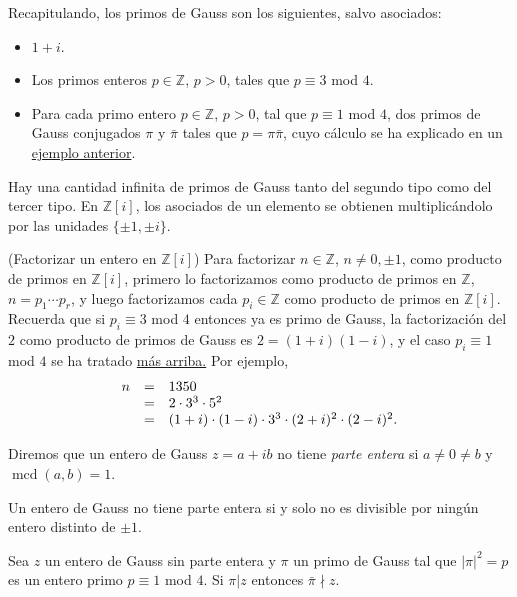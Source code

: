
Recapitulando, los primos de Gauss son los siguientes, salvo asociados:

\begin{itemize}
\item
  \(1+i\).
\item
  Los primos enteros \(p\in \mathbb{Z}\), \(p > 0\), tales que
  \(p\equiv 3\) mod \(4\).
\item
  Para cada primo entero \(p\in\mathbb{Z}\), \(p > 0\), tal que
  \(p\equiv 1\) mod \(4\), dos primos de Gauss conjugados \(\pi\) y
  \(\bar{\pi}\) tales que \(p=\pi\bar{\pi}\), cuyo cálculo se ha
  explicado en un \protect\hyperlink{exm:prime1mod4}{ejemplo anterior}.
\end{itemize}

Hay una cantidad infinita de primos de Gauss tanto del segundo tipo como
del tercer tipo. En \(\mathbb{Z}[i]\), los asociados de un elemento se
obtienen multiplicándolo por las unidades \(\{\pm1,\pm i\}\).

\textrm{\normalfont (Factorizar un entero en $\mathbb Z[i]$)}\label{exm:integer}
Para factorizar \(n\in\mathbb{Z}\), \(n\neq 0,\pm1\), como producto de
primos en \(\mathbb{Z}[i]\), primero lo factorizamos como producto de
primos en \(\mathbb{Z}\), \(n=p_1\cdots p_r\), y luego factorizamos cada
\(p_i\in\mathbb{Z}\) como producto de primos en \(\mathbb{Z}[i]\).
Recuerda que si \(p_i\equiv 3\) mod \(4\) entonces ya es primo de Gauss,
la factorización del \(2\) como producto de primos de Gauss es
\(2=(1+i)(1-i)\), y el caso \(p_i\equiv 1\) mod \(4\) se ha tratado
\protect\hyperlink{exm:prime1mod4}{más arriba.} Por ejemplo, \[
\begin{array}{rcl}
n&=&1350\cr
&=&2\cdot 3^3\cdot 5^2\cr
&=&(1+i)\cdot(1-i)\cdot 3^3\cdot(2+i)^2\cdot(2-i)^2.
\end{array}
\] 


Diremos que un entero de Gauss \(z=a+ib\) no tiene \emph{parte entera}
si \(a\neq 0\neq b\) y \(\operatorname{mcd}(a,b)=1\). 


Un entero de Gauss no tiene parte entera si y solo no es divisible por
ningún entero distinto de \(\pm1\). 


Sea \(z\) un entero de Gauss sin parte entera y \(\pi\) un primo de
Gauss tal que \(|\pi|^2=p\) es un entero primo \(p\equiv 1\) mod \(4\).
Si \(\pi|z\) entonces \(\bar{\pi}\nmid z\). 

